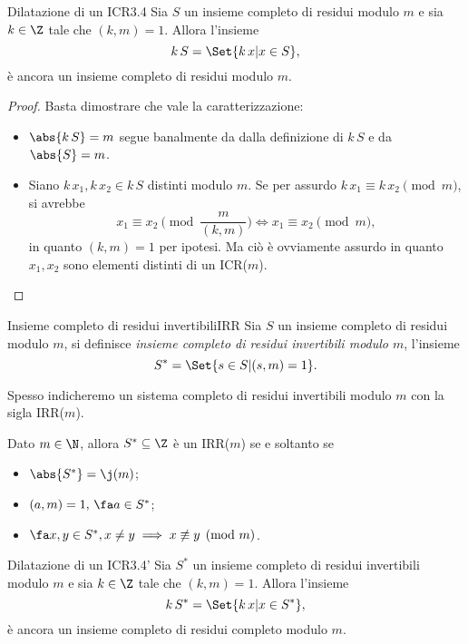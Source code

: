 \begin{teor}{Dilatazione di un ICR}{3.4}
	Sia \(S\) un insieme completo di residui modulo \(m\) e sia \(k\in\Z\) tale che \((k,m)=1\).
	Allora l'insieme
	\[
		k\,S = \Set{k\,x | x \in S},
	\]
	è ancora un insieme completo di residui modulo \(m\).
\end{teor}

\begin{proof}
	Basta dimostrare che vale la caratterizzazione:
	\begin{itemize}
		\item \(\abs{k\,S} = m\) segue banalmente da dalla definizione di \(k\,S\) e da \(\abs{S} = m\).
		\item Siano \(k\,x_1,k\,x_2\in k\,S\) distinti modulo \(m\).
		      Se per assurdo \(k\,x_1 \equiv k\,x_2 \pmod{m}\), si avrebbe
		      \[
			      x_1 \equiv x_2 \pmod{\frac{m}{(k,m)}} \iff x_1 \equiv x_2 \pmod{m},
		      \]
		      in quanto \((k,m) = 1\) per ipotesi.
		      Ma ciò è ovviamente assurdo in quanto \(x_1,x_2\) sono elementi distinti di un ICR(\(m\)).
	\end{itemize}
\end{proof}

\begin{defn}{Insieme completo di residui invertibili}{IRR}
	Sia \(S\) un insieme completo di residui modulo \(m\), si definisce \emph{insieme completo di residui invertibili modulo \(m\)}, l'insieme
	\[
		S^* = \Set{s\in S | (s,m) = 1}.
	\]
\end{defn}

\begin{notz}
	Spesso indicheremo un sistema completo di residui invertibili modulo \(m\) con la sigla IRR(\(m\)).
\end{notz}

\begin{pr*}
	Dato \(m\in\N\), allora \(S^*\subseteq \Z\) è un IRR(\(m\)) se e soltanto se
	\begin{itemize}
		\item \(\abs{S^*} = \j(m)\);
		\item \((a,m) = 1,\,\fa a \in S^*\);
		\item \(\fa x,y \in S^*, x\neq y \implies x\not\equiv y \pmod{m}\).
	\end{itemize}
\end{pr*}
%
%
\begin{teor}{Dilatazione di un ICR}{3.4'}
	Sia \(S^*\) un insieme completo di residui invertibili modulo \(m\) e sia \(k\in\Z\) tale che \((k,m)=1\).
	Allora l'insieme
	\[
		k\,S^* = \Set{k\,x | x \in S^*},
	\]
	è ancora un insieme completo di residui completo modulo \(m\).
\end{teor}

